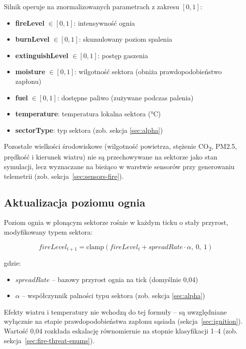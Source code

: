 Silnik operuje na znormalizowanych parametrach z zakresu $[0,1]$:
\begin{itemize}
    \item \textbf{fireLevel} $\in [0,1]$: intensywność ognia
    \item \textbf{burnLevel} $\in [0,1]$: skumulowany poziom spalenia
    \item \textbf{extinguishLevel} $\in [0,1]$: postęp gaszenia
    \item \textbf{moisture} $\in [0,1]$: wilgotność sektora (obniża prawdopodobieństwo zapłonu)
    \item \textbf{fuel} $\in [0,1]$: dostępne paliwo (zużywane podczas palenia)
    \item \textbf{temperature}: temperatura lokalna sektora (°C)
    \item \textbf{sectorType}: typ sektora (zob. sekcja \ref{sec:alpha})
\end{itemize}

Pozostałe wielkości środowiskowe (wilgotność powietrza, stężenie CO\textsubscript{2}, PM2.5, prędkość i kierunek wiatru) nie są przechowywane na sektorze jako stan symulacji, lecz wyznaczane na bieżąco w warstwie sensorów przy generowaniu telemetrii (zob. sekcja~\ref{sec:sensors-fire}).

\subsection{Aktualizacja poziomu ognia}

Poziom ognia w płonącym sektorze rośnie w każdym ticku o stały przyrost, modyfikowany typem sektora:

\begin{equation}
fireLevel_{t+1} = \mathrm{clamp}\!\left(fireLevel_t + spreadRate \cdot \alpha,\ 0,\ 1\right)
\end{equation}

gdzie:
\begin{itemize}
    \item $spreadRate$ -- bazowy przyrost ognia na tick (domyślnie 0,04)
    \item $\alpha$ -- współczynnik palności typu sektora (zob. sekcja \ref{sec:alpha})
\end{itemize}

Efekty wiatru i temperatury nie wchodzą do tej formuły -- są uwzględniane wyłącznie na etapie prawdopodobieństwa zapłonu sąsiada (sekcja~\ref{sec:ignition}). Wartość 0,04 rozkłada eskalację równomiernie na stopnie klasyfikacji 1--4 (zob. sekcja~\ref{sec:fire-threat-enums}).

